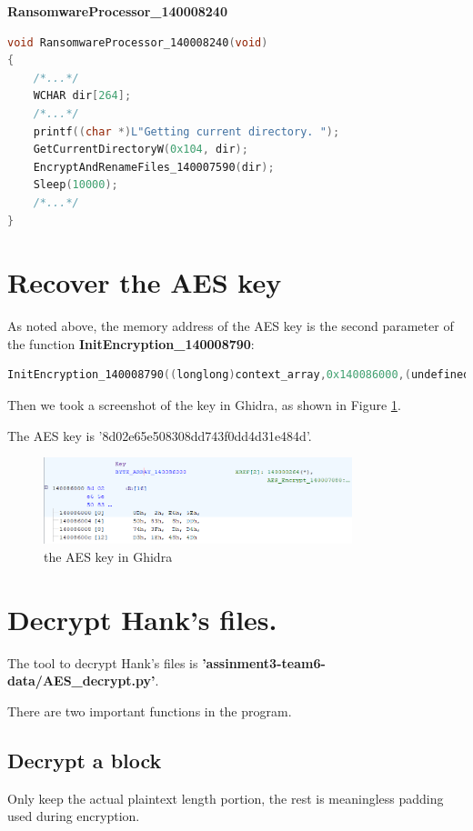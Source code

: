\documentclass[11pt]{article}
\begin{document}
\textbf{RansomwareProcessor\_140008240}
\begin{lstlisting}[language=c++, caption=RansomwareProcessor\_140008240]
void RansomwareProcessor_140008240(void)
{
    /*...*/
    WCHAR dir[264];
    /*...*/
    printf((char *)L"Getting current directory. ");
    GetCurrentDirectoryW(0x104, dir);
    EncryptAndRenameFiles_140007590(dir);
    Sleep(10000);
    /*...*/
}
\end{lstlisting}




\section{Recover the AES key}
As noted above, the memory address of the AES key is the second parameter of the function \textbf{InitEncryption\_140008790}:
\begin{lstlisting}[language=c++, caption=call of InitEncryption\_140008790]
InitEncryption_140008790((longlong)context_array,0x140086000,(undefined8 *)IV_140086010);                              /*Address of AES key*/
\end{lstlisting}

Then we took a screenshot of the key in Ghidra, as shown in Figure \ref{fig:key}.

The AES key is '8d02e65e508308dd743f0dd4d31e484d'.
\begin{figure}[htbp]
    \centering
    \includegraphics[width=0.8\textwidth]{img/key.png}
    \caption{the AES key in Ghidra}
    \label{fig:key}
\end{figure}

\section{Decrypt Hank's files.}
The tool to decrypt Hank's files is \textbf{'assinment3-team6-data/AES\_decrypt.py'}.

There are two important functions in the program.

\subsection{Decrypt a block}
Only keep the actual plaintext length portion, the rest is meaningless padding used during encryption.
\end{document}
